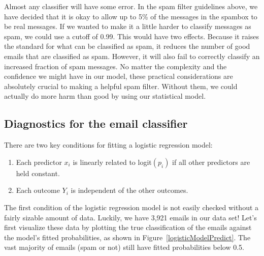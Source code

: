 Almost any classifier will have some error. In the spam filter guidelines above, we have decided that it is okay to allow up to 5\% of the messages in the spambox to be real messages. If we wanted to make it a little harder to classify messages as spam, we could use a cutoff of 0.99. This would have two effects. Because it raises the standard for what can be classified as spam, it reduces the number of good emails that are classified as spam. However, it will also fail to correctly classify an increased fraction of spam messages. No matter the complexity and the confidence we might have in our model, these practical considerations are absolutely crucial to making a helpful spam filter. Without them, we could actually do more harm than good by using our statistical model.


\subsection{Diagnostics for the email classifier}

\begin{termBox}{
There are two key conditions for fitting a logistic regression model: \vspace{-1.5mm}
\begin{enumerate}
\setlength{\itemsep}{0mm}
\item Each predictor $x_i$ is linearly related to logit$(p_i)$ if all other predictors are held constant.
\item Each outcome $Y_i$ is independent of the other outcomes.
\end{enumerate}}
\end{termBox}

The first condition of the logistic regression model is not easily checked without a fairly sizable amount of data. Luckily, we have 3,921 emails in our data set! Let's first visualize these data by plotting the true classification of the emails against the model's fitted probabilities, as shown in Figure~\ref{logisticModelPredict}. The vast majority of emails (spam or not) still have fitted probabilities below 0.5.

